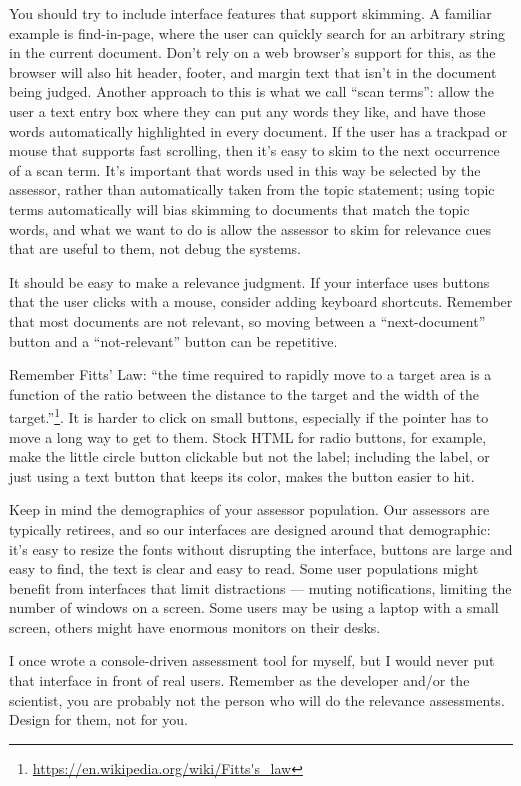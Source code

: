 \documentclass[nobib]{tufte-book}
\begin{document}
You should try to include interface features that support skimming.  A familiar example is find-in-page, where the user can quickly search for an arbitrary string in the current document.  Don't rely on a web browser's support for this, as the browser will also hit header, footer, and margin text that isn't in the document being judged.  Another approach to this is what we call ``scan terms'': allow the user a text entry box where they can put any words they like, and have those words automatically highlighted in every document.  If the user has a trackpad or mouse that supports fast scrolling, then it's easy to skim to the next occurrence of a scan term.  It's important that words used in this way be selected by the assessor, rather than automatically taken from the topic statement; using topic terms automatically will bias skimming to documents that match the topic words, and what we want to do is allow the assessor to skim for relevance cues that are useful to them, not debug the systems.

It should be easy to make a relevance judgment.  If your interface uses buttons that the user clicks with a mouse, consider adding keyboard shortcuts.  Remember that most documents are not relevant, so moving between a ``next-document'' button and a ``not-relevant'' button can be repetitive.

Remember Fitts' Law: ``the time required to rapidly move to a target area is a function of the ratio between the distance to the target and the width of the target.''\footnote{\url{https://en.wikipedia.org/wiki/Fitts's_law}}.  It is harder to click on small buttons, especially if the pointer has to move a long way to get to them.  Stock HTML for radio buttons, for example, make the little circle button clickable but not the label; including the label, or just using a text button that keeps its color, makes the button easier to hit.

Keep in mind the demographics of your assessor population.  Our assessors are typically retirees, and so our interfaces are designed around that demographic: it's easy to resize the fonts without disrupting the interface, buttons are large and easy to find, the text is clear and easy to read.  Some user populations might benefit from interfaces that limit distractions --- muting notifications, limiting the number of windows on a screen.  Some users may be using a laptop with a small screen, others might have enormous monitors on their desks.

I once wrote a console-driven assessment tool for myself, but I would never put that interface in front of real users.  Remember as the developer and/or the scientist, you are probably not the person who will do the relevance assessments.  Design for them, not for you.
\end{document}
